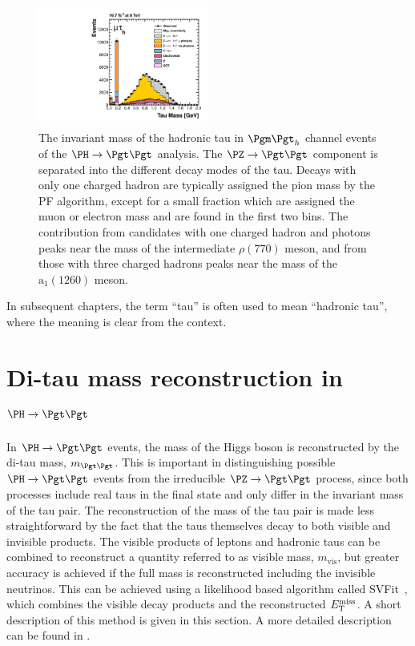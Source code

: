 \begin{figure}[htb]
\begin{center}
    \includegraphics[width=0.5\textwidth]
      {plots/reco/m_2_tau_modes_mt_2012.pdf}
\end{center}
\caption[The invariant mass of the hadronic tau in $\mutau$ channel events of
the $\PH\to\Pgt\Pgt$ analysis.]{The invariant mass of the hadronic tau in $\mutau$ channel events of
the $\PH\to\Pgt\Pgt$ analysis. The $\PZ\to\Pgt\Pgt$ component is separated into the
different decay modes of the tau. Decays with only one charged hadron are
typically assigned the pion mass by the \ac{PF} algorithm, except for a small
fraction which are assigned the muon or electron mass and are found in the first
two bins. The contribution from candidates with one charged hadron and photons
peaks near the mass of the intermediate $\rho(770)$ meson, and from those with
three charged hadrons peaks near the mass of the $\text{a}_{1}(1260)$ meson.}
\label{fig:taumass}
\end{figure}

In subsequent chapters, the term ``tau'' is often used to mean ``hadronic tau'',
where the meaning is clear from the context.

\section{Di-tau mass reconstruction in $\PH \to \Pgt\Pgt$}
\label{sec:svfit}

In $\PH \to \Pgt\Pgt$ events, the mass of the Higgs boson is reconstructed by
the di-tau mass, $m_{\Pgt\Pgt}$. This is important in distinguishing possible $\PH\to\Pgt\Pgt$
events from the irreducible $\PZ \to \Pgt\Pgt$ process, since both processes
include real taus in the final state and only differ in the invariant mass of the tau pair. 
The reconstruction of the mass of the tau pair is made less straightforward
by the fact that the taus themselves decay to both visible and invisible
products. The visible products of leptons and hadronic taus can be combined to
reconstruct a quantity referred to as visible mass, $m_{\text{vis}}$,
but greater accuracy is achieved if the full mass is reconstructed including the
invisible neutrinos. This can be achieved using a likelihood based algorithm called
SVFit~\cite{HIG-13-004}, which combines the visible decay products and the reconstructed $E_{\mathrm{T}}^{\text{miss}}$. A
short description of this method is given in this section. A more detailed
description can be found in \cite{HIG-13-004}.

